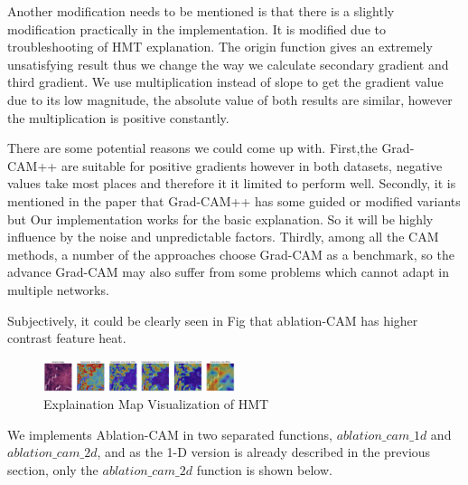 \documentclass[conference]{IEEEtran}
\begin{document}
Another modification needs to be mentioned is that there is a slightly modification practically in the implementation. It is modified due to troubleshooting of HMT explanation. The origin function gives an extremely unsatisfying result thus we change the way we calculate secondary gradient and third gradient. We use multiplication instead of slope to get the gradient value due to its low magnitude, the absolute value of both results are similar, however the multiplication is positive constantly.\par
There are some potential reasons we could come up with. First,the Grad-CAM++ are suitable for positive gradients however in both datasets, negative values take most places and therefore it it limited to perform well. Secondly, it is mentioned in the paper that Grad-CAM++ has some guided or modified variants but Our implementation works for the basic explanation. So it will be highly influence by the noise and unpredictable factors. Thirdly, among all the CAM methods, a number of the approaches choose Grad-CAM as a benchmark, so the advance Grad-CAM may also suffer from some problems which cannot adapt in multiple networks.\par
Subjectively, it could be clearly seen in Fig that ablation-CAM has higher contrast feature heat.

\begin{figure}[h] 
    \centering
    \includegraphics[width=0.5\textwidth]{plot.png}
    \caption{Explaination Map Visualization of HMT} 
\end{figure}

We implements Ablation-CAM in two separated functions, $ablation\_cam\_1d$ and $ablation\_cam\_2d$, and  as the 1-D version is already described in the previous section, only the $ablation\_cam\_2d$ function is shown below.
\end{document}
